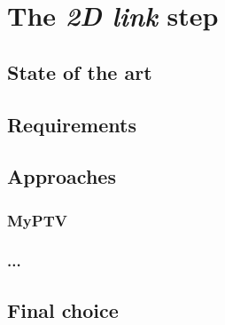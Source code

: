 \chapter{The \textit{2D link} step}
\label{chap:2dlink}

\section{State of the art}
\section{Requirements}
\section{Approaches}
\subsection{MyPTV}
\subsection{...}
\section{Final choice}
